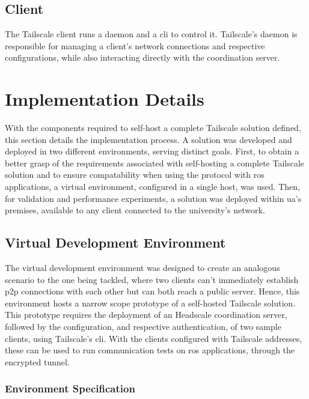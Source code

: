 \documentclass[11pt,twoside,a4paper]{report}
\begin{document}
\subsection{Client}

The Tailscale client runs a daemon and a \ac{cli} to control it. Tailscale's daemon is responsible for managing a client's network connections and respective configurations, while also interacting directly with the coordination server.

\section{Implementation Details}

With the components required to self-host a complete Tailscale solution defined, this section details the implementation process. A solution was developed and deployed in two different environments, serving distinct goals. First, to obtain a better grasp of the requirements associated with self-hosting a complete Tailscale solution and to ensure compatability when using the protocol with \ac{ros} applications, a virtual environment, configured in a single host, was used. Then, for validation and performance experiments, a solution was deployed within \ac{ua}'s premises, available to any client connected to the university's network.

\subsection{Virtual Development Environment}

The virtual development environment was designed to create an analogous scenario to the one being tackled, where two clients can't immediately establish \ac{p2p} connections with each other but can both reach a public server. Hence, this environment hosts a narrow scope prototype of a self-hosted Tailscale solution. This prototype requires the deployment of an Headscale coordination server, followed by the configuration, and respective authentication, of two sample clients, using Tailscale's \ac{cli}. With the clients configured with Tailscale addresses, these can be used to run communication tests on \ac{ros} applications, through the encrypted tunnel.

\subsubsection{Environment Specification}
\end{document}
